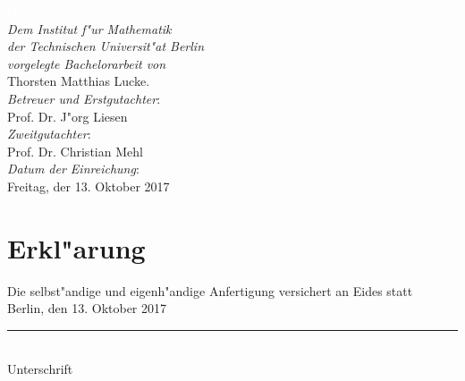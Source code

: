 \documentclass[11pt, twoside]{report}
\begin{document}


\thispagestyle{empty}
\textcolor{white}{bla} \\
\vfill
\textit{Dem Institut f"ur Mathematik\\
der Technischen Universit"at Berlin\\
vorgelegte Bachelorarbeit von} \\
Thorsten Matthias Lucke.\\

\textit{Betreuer und Erstgutachter}:\\
Prof. Dr. J"org Liesen\\

\emph{Zweitgutachter}:\\ Prof. Dr. Christian Mehl\\

\emph{Datum der Einreichung}:\\
Freitag, der 13. Oktober 2017


\chapter*{Erkl"arung}
\thispagestyle{empty}
Die selbst"andige und eigenh"andige Anfertigung versichert an Eides statt\\

Berlin, den 13. Oktober 2017\\

\rule{5cm}{1pt}\\
Unterschrift








\newpage

\chapter*{}
\thispagestyle{empty}
\end{document}
